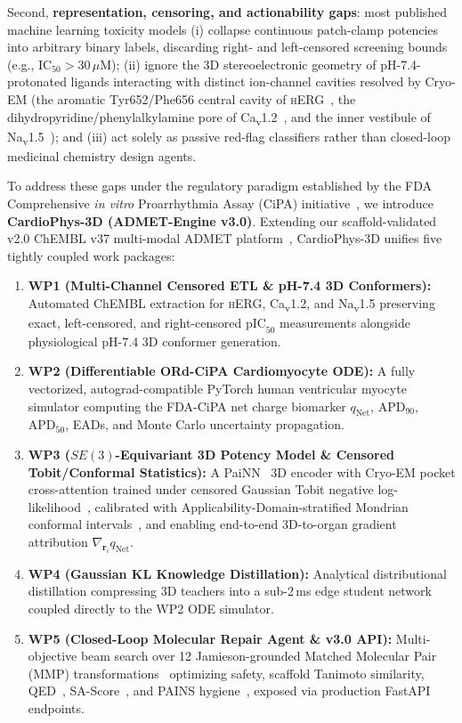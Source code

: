 \documentclass[10pt,twocolumn,letterpaper]{article}
\newcommand{\qnet}{q_{\mathrm{Net}}}
\newcommand{\pic}{\mathrm{pIC}_{50}}
\newcommand{\apd}{\mathrm{APD}_{90}}
\begin{document}
Second, \textbf{representation, censoring, and actionability gaps}: most published machine learning toxicity models (i) collapse continuous patch-clamp potencies into arbitrary binary labels, discarding right- and left-censored screening bounds (e.g., $\mathrm{IC}_{50} > 30\,\mu\mathrm{M}$); (ii) ignore the 3D stereoelectronic geometry of pH-7.4-protonated ligands interacting with distinct ion-channel cavities resolved by Cryo-EM (the aromatic Tyr652/Phe656 central cavity of \textsc{hERG}~\cite{wang2017cryoem}, the dihydropyridine/phenylalkylamine pore of Ca\textsubscript{v}1.2~\cite{gao2022structural}, and the inner vestibule of Na\textsubscript{v}1.5~\cite{jiang2020structure}); and (iii) act solely as passive red-flag classifiers rather than closed-loop medicinal chemistry design agents.

To address these gaps under the regulatory paradigm established by the FDA Comprehensive \textit{in vitro} Proarrhythmia Assay (CiPA) initiative~\cite{colatsky2016comprehensive,dutta2017optimization,li2019assessment}, we introduce \textbf{CardioPhys-3D (ADMET-Engine v3.0)}. Extending our scaffold-validated v2.0 ChEMBL v37 multi-modal ADMET platform~\cite{yang2019analyzing,bemis1996properties,zdrazil2024chembl}, CardioPhys-3D unifies five tightly coupled work packages:
\begin{enumerate}
  \item \textbf{WP1 (Multi-Channel Censored ETL \& pH-7.4 3D Conformers):} Automated ChEMBL extraction for \textsc{hERG}, Ca\textsubscript{v}1.2, and Na\textsubscript{v}1.5 preserving exact, left-censored, and right-censored $\pic$ measurements alongside physiological pH-7.4 3D conformer generation.
  \item \textbf{WP2 (Differentiable ORd-CiPA Cardiomyocyte ODE):} A fully vectorized, autograd-compatible PyTorch human ventricular myocyte simulator computing the FDA-CiPA net charge biomarker $\qnet$, $\apd$, $\mathrm{APD}_{50}$, EADs, and Monte Carlo uncertainty propagation.
  \item \textbf{WP3 ($SE(3)$-Equivariant 3D Potency Model \& Censored Tobit/Conformal Statistics):} A PaiNN~\cite{schutt2021equivariant} 3D encoder with Cryo-EM pocket cross-attention trained under censored Gaussian Tobit negative log-likelihood~\cite{tobin1958estimation}, calibrated with Applicability-Domain-stratified Mondrian conformal intervals~\cite{vovk2005algorithmic}, and enabling end-to-end 3D-to-organ gradient attribution $\nabla_{\mathbf{r}_i}\qnet$.
  \item \textbf{WP4 (Gaussian KL Knowledge Distillation):} Analytical distributional distillation compressing 3D teachers into a sub-2\,ms edge student network coupled directly to the WP2 ODE simulator.
  \item \textbf{WP5 (Closed-Loop Molecular Repair Agent \& v3.0 API):} Multi-objective beam search over 12 Jamieson-grounded Matched Molecular Pair (MMP) transformations~\cite{jamieson2006medicinal} optimizing safety, scaffold Tanimoto similarity, QED~\cite{bickerton2012quantifying}, SA-Score~\cite{ertl2009estimation}, and PAINS hygiene~\cite{baell2010new}, exposed via production FastAPI endpoints.
\end{enumerate}
\end{document}
